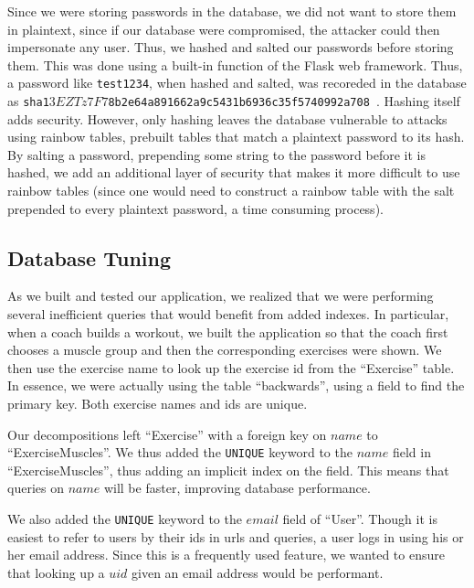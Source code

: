 \documentclass{article}
\begin{document}
Since we were storing passwords in the database, we did not want to store them
in plaintext, since if our database were compromised, the attacker could then
impersonate any user. Thus, we hashed and salted our passwords before storing them.
This was done using a built-in function of the Flask web framework. Thus,
a password like {\tt test1234}, when hashed and salted, was recoreded in the
database as {\tt sha1$3EZTz7F7$8b2e64a891662a9c5431b6936c35f5740992a708 }. 
Hashing itself adds security. However, only hashing leaves the database vulnerable
to attacks using rainbow tables, prebuilt tables that match a plaintext password
to its hash. By salting a password, prepending some string to the password before
it is hashed, we add an additional layer of security that makes it more difficult
to use rainbow tables (since one would need to construct a rainbow table with the salt
prepended to every plaintext password, a time consuming process).

\subsection*{Database Tuning}

As we built and tested our application, we realized that we were performing several
inefficient queries that would benefit from added indexes. In particular, when 
a coach builds a workout, we built the application so that the coach first chooses
a muscle group and then the corresponding exercises were shown. We then use
the exercise name to look up the exercise id from the ``Exercise'' table. 
In essence, we were actually using the table ``backwards'', using a field
to find the primary key. Both exercise names and ids are unique.

Our decompositions left ``Exercise'' with a foreign key on $name$ 
to ``ExerciseMuscles''. We thus added the {\tt UNIQUE} keyword to the $name$
field in ``ExerciseMuscles'', thus adding an implicit index on the field. This
means that queries on $name$ will be faster, improving database performance.

We also added the {\tt UNIQUE} keyword to the $email$ field of ``User''. 
Though it is easiest to refer to users by their ids in urls and queries, a 
user logs in using his or her email address. Since this is a frequently used
feature, we wanted to ensure that looking up a $uid$ given an email address
would be performant. 
\end{document}
